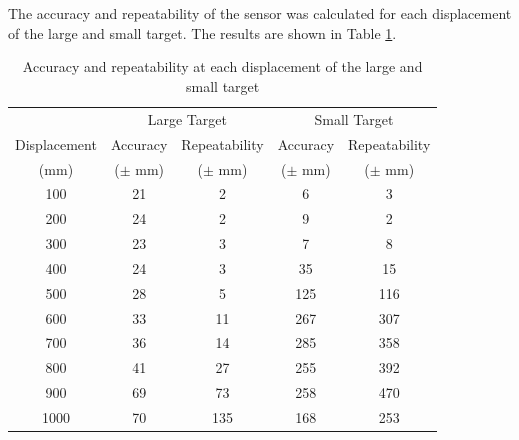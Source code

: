 \section{}
\subsection{}
The accuracy and repeatability of the sensor was calculated for each displacement of the large and small target. The results are shown in Table \ref{tab:Q3a}. 


\begin{table}[h]
    \centering
    \caption{Accuracy and repeatability at each displacement of the large and small target}
    \label{tab:Q3a}
    \begin{tabular}{ccccc}
        \hline
        & \multicolumn{2}{c}{Large Target} & \multicolumn{2}{c}{Small Target} \\
        Displacement & Accuracy & Repeatability & Accuracy & Repeatability \\
        (mm) & ($\pm$ mm) & ($\pm$ mm) & ($\pm$ mm) & ($\pm$ mm) \\
        \midrule
        100 & 21 & 2 & 6 & 3 \\
        200 & 24 & 2 & 9 & 2 \\
        300 & 23 & 3 & 7 & 8 \\
        400 & 24 & 3 & 35 & 15 \\
        500 & 28 & 5 & 125 & 116 \\
        600 & 33 & 11 & 267 & 307 \\
        700 & 36 & 14 & 285 & 358 \\
        800 & 41 & 27 & 255 & 392 \\
        900 & 69 & 73 & 258 & 470 \\
        1000 & 70 & 135 & 168 & 253 \\
        \hline
    \end{tabular}
\end{table}

